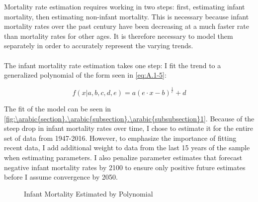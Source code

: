 \documentclass[10pt]{article}
\renewcommand{\thesection}{\arabic{section}}
\renewcommand{\thesubsection}{\thesection.\arabic{subsection}}
\renewcommand{\thesubsubsection}{\thesubsection.\arabic{subsubsection}}
\numberwithin{equation}{subsection}
\renewcommand{\subsubsection}[2][]{\oldsubsubsection[#1]{#2}\index{#1}\label{sec:\thesubsubsection}}
\newcommand*{\FigureDir}{../../graphs}
\begin{document}
\begin{appendices}

\subsubsection{Mortality Rates}

Mortality rate estimation requires working in two steps: first, estimating infant mortality, then estimating non-infant mortality. This is necessary because infant mortality rates over the past century have been decreasing at a much faster rate than mortality rates for other ages. It is therefore necessary to model them separately in order to accurately represent the varying trends.
\\\\
The infant mortality rate estimation takes one step: I fit the trend to a generalized polynomial of the form seen in \ref{eq:A.1-5}:

\begin{equation}
   f(x|a, b, c, d, e) = a (e \cdot x - b)^{\frac{1}{c}} + d
\end{equation}

\noindent
The fit of the model can be seen in \autoref{fig:\thesubsubsection1}. Because of the steep drop in infant mortality rates over time, I chose to estimate it for the entire set of data from 1947-2016. However, to emphasize the importance of fitting recent data, I add additional weight to data from the last 15 years of the sample when estimating parameters. I also penalize parameter estimates that forecast negative infant mortality rates by 2100 to ensure only positive future estimates before I assume convergence by 2050.

\begin{figure}[H]
   \centering
   \caption{\label{fig:\thesubsubsection1}Infant Mortality Estimated by Polynomial}
\end{figure}


\end{appendices}
\end{document}
